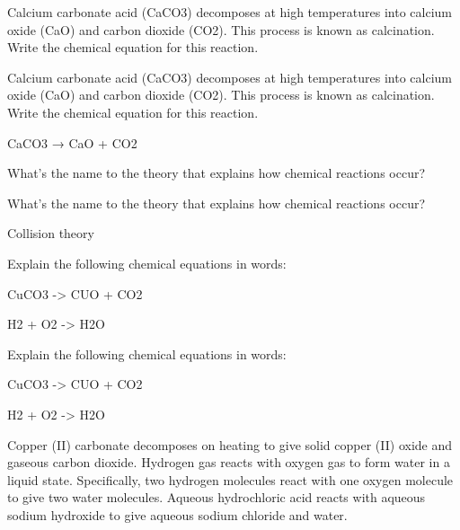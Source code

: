 \begin{exercise}
    Calcium carbonate acid (CaCO3) decomposes at
    high temperatures into calcium oxide (CaO) and
    carbon dioxide (CO2). This process is known as
    calcination. Write the chemical equation for this
    reaction.
    \begin{solu}{}
         Calcium carbonate acid (CaCO3) decomposes at high temperatures into calcium oxide (CaO) and carbon dioxide (CO2). This process is known as calcination. Write the chemical equation for this reaction.

        \begin{reaction*}
            CaCO3\sld{} → CaO\sld{} + CO2\gas{}
        \end{reaction*}
    \end{solu}
\end{exercise}

\begin{exercise}
    What's the name to the theory that explains how chemical reactions occur?
    \begin{solu}{}
         What's the name to the theory that explains how chemical reactions occur?

        Collision theory
    \end{solu}
\end{exercise}

\begin{exercise}
    Explain the following chemical equations in words:
    \begin{reaction*}
        CuCO3\sld{} -> CUO\sld{} + CO2\gas{}
    \end{reaction*}
    \begin{reaction*}
        H2\gas{} + O2\gas{} ->  H2O\lqd{}
    \end{reaction*}
    \begin{solu}
         Explain the following chemical equations in words:
    \begin{reaction*}
        CuCO3\sld{} -> CUO\sld{} + CO2\gas{}
    \end{reaction*}
    \begin{reaction*}
        H2\gas{} + O2\gas{} ->  H2O\lqd{}
    \end{reaction*}


        Copper (II) carbonate decomposes on heating to
        give solid copper (II) oxide and gaseous carbon
        dioxide.
        Hydrogen gas reacts with oxygen gas to form
        water in a liquid state. Specifically, two hydrogen
        molecules react with one oxygen molecule to give
        two water molecules.
        Aqueous hydrochloric acid reacts with aqueous
        sodium hydroxide to give aqueous sodium chloride
        and water.
    \end{solu}
\end{exercise}


